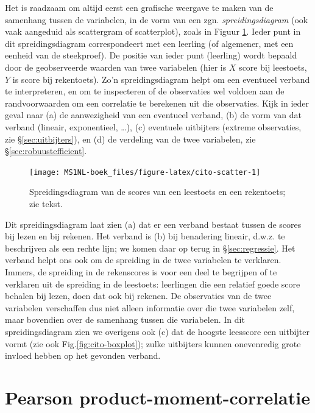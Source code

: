 \documentclass[
]{book}
\begin{document}
Het is raadzaam om altijd eerst een grafische weergave te maken van de
samenhang tussen de variabelen, in de vorm van een zgn.
\emph{spreidingsdiagram} (ook vaak aangeduid als scattergram of scatterplot),
zoals in Figuur \ref{fig:cito-scatter}. Ieder punt in dit spreidingsdiagram
correspondeert met een leerling (of algemener, met een eenheid van de
steekproef). De positie van ieder punt (leerling) wordt bepaald door de
geobserveerde waarden van twee variabelen (hier is \(X\) score bij
leestoets, \(Y\) is score bij rekentoets). Zo'n spreidingsdiagram helpt om
een eventueel verband te interpreteren, en om te inspecteren of de
observaties wel voldoen aan de randvoorwaarden om een correlatie te
berekenen uit die observaties. Kijk in ieder geval naar (a) de
aanwezigheid van een eventueel verband, (b) de vorm van dat verband
(lineair, exponentieel, \ldots), (c) eventuele uitbijters (extreme
observaties, zie §\ref{sec:uitbijters}), en (d) de verdeling van de twee
variabelen, zie §\ref{sec:robuustefficient}.

\begin{figure}

{\centering \texttt{[image: MS1NL-boek\_files/figure-latex/cito-scatter-1]} 

}

\caption{Spreidingsdiagram van de scores van een leestoets en een rekentoets; zie tekst.}\label{fig:cito-scatter}
\end{figure}

Dit spreidingsdiagram laat zien (a) dat er een verband bestaat tussen de
scores bij lezen en bij rekenen. Het verband is (b) bij benadering lineair, d.w.z. te
beschrijven als een rechte lijn; we komen daar op terug in
§\ref{sec:regressie}.
Het verband helpt ons ook om de spreiding in de twee variabelen te
verklaren. Immers, de spreiding in de rekenscores is voor een deel te
begrijpen of te verklaren uit de spreiding in de leestoets: leerlingen
die een relatief goede score behalen bij lezen, doen dat ook bij
rekenen. De observaties van de twee variabelen verschaffen dus niet
alleen informatie over die twee variabelen zelf, maar bovendien over de
samenhang tussen die variabelen. In dit spreidingsdiagram zien we
overigens ook (c) dat de hoogste leesscore een uitbijter vormt (zie ook
Fig.\ref{fig:cito-boxplot}); zulke uitbijters kunnen onevenredig
grote invloed hebben op het gevonden verband.

\hypertarget{sec:Pearson}{%
\section{Pearson product-moment-correlatie}\label{sec:Pearson}}
\end{document}
